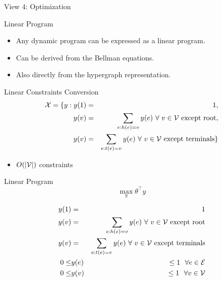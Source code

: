 \documentclass{beamer}
\newcommand{\air}{\vspace{0.5cm}}
\begin{document}
\begin{frame}
  \begin{center}
    \Large{View 4: Optimization}
  \end{center}
\end{frame}

\begin{frame}{Linear Program}
  \begin{itemize}
    \item
      Any dynamic program can be expressed as a linear program. 
      \air 

    \item
      Can be derived from the Bellman equations.
  
      \air 
    \item Also directly from the hypergraph representation.

   \end{itemize}
\end{frame}

\begin{frame}{Linear Constraints Conversion}
  \begin{eqnarray*}
  {\cal X} = \{ y : y(1) &=& 1, \\
  y(v) &=& \sum_{e : h(e) = v} y(e)\ \forall \ v \in {\cal V} \mbox{ except root},  \\
  y(v) &=& \sum_{e : t(e)= v} y(e)\ \forall \ v \in {\cal V} \mbox{ except terminals} \} \\
\end{eqnarray*}
\pause
\begin{itemize}
  \item$O(|{\cal V}|)$ constraints
\end{itemize}
\end{frame}

\begin{frame}{Linear Program}
  \[ \max_{y} \theta^\top y\] 

  \begin{eqnarray*}
  y(1) &=& 1 \\
  y(v) &=& \sum_{e : h(e) = v} y(e)\ \forall \ v \in {\cal V} \mbox{ except root}  \\
  y(v) &=& \sum_{e : t(e)= v} y(e)\ \forall \ v \in {\cal V} \mbox{ except terminals}  \\
  0 \leq &y(e) & \leq 1\ \  \forall e \in {\cal E} \\
  0 \leq &y(v) &\leq 1 \ \  \forall v \in {\cal V} \\
\end{eqnarray*}
\end{frame}
\end{document}
